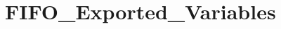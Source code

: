 \hypertarget{group___f_i_f_o___exported___variables}{}\section{F\+I\+F\+O\+\_\+\+Exported\+\_\+\+Variables}
\label{group___f_i_f_o___exported___variables}

